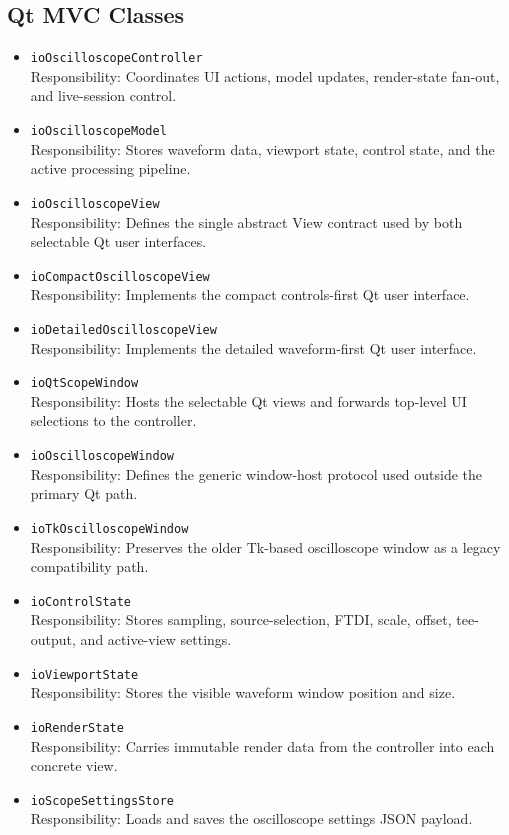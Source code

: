 \subsection{Qt MVC Classes}
\begin{itemize}
    \item \texttt{ioOscilloscopeController} \\
    Responsibility: Coordinates UI actions, model updates, render-state fan-out, and live-session control.

    \item \texttt{ioOscilloscopeModel} \\
    Responsibility: Stores waveform data, viewport state, control state, and the active processing pipeline.

    \item \texttt{ioOscilloscopeView} \\
    Responsibility: Defines the single abstract View contract used by both selectable Qt user interfaces.

    \item \texttt{ioCompactOscilloscopeView} \\
    Responsibility: Implements the compact controls-first Qt user interface.

    \item \texttt{ioDetailedOscilloscopeView} \\
    Responsibility: Implements the detailed waveform-first Qt user interface.

    \item \texttt{ioQtScopeWindow} \\
    Responsibility: Hosts the selectable Qt views and forwards top-level UI selections to the controller.

    \item \texttt{ioOscilloscopeWindow} \\
    Responsibility: Defines the generic window-host protocol used outside the primary Qt path.

    \item \texttt{ioTkOscilloscopeWindow} \\
    Responsibility: Preserves the older Tk-based oscilloscope window as a legacy compatibility path.

    \item \texttt{ioControlState} \\
    Responsibility: Stores sampling, source-selection, FTDI, scale, offset, tee-output, and active-view settings.

    \item \texttt{ioViewportState} \\
    Responsibility: Stores the visible waveform window position and size.

    \item \texttt{ioRenderState} \\
    Responsibility: Carries immutable render data from the controller into each concrete view.

    \item \texttt{ioScopeSettingsStore} \\
    Responsibility: Loads and saves the oscilloscope settings JSON payload.
\end{itemize}

